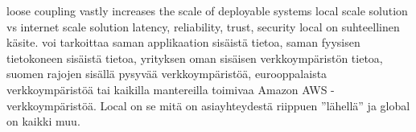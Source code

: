 \documentclass[finnish,gradu]{tktltiki}
\begin{document}
  loose coupling vastly increases the scale of deployable systems
  local scale solution vs internet scale solution
  latency, reliability, trust, security
  local on suhteellinen käsite. voi tarkoittaa saman applikaation sisäistä tietoa, saman fyysisen tietokoneen sisäistä tietoa, yrityksen oman sisäisen verkkoympäristön tietoa, suomen rajojen sisällä pysyvää verkkoympäristöä, eurooppalaista verkkoympäristöä tai kaikilla mantereilla toimivaa Amazon AWS -verkkoympäristöä. Local on se mitä on asiayhteydestä riippuen ''lähellä'' ja global on kaikki muu.


\end{document}
